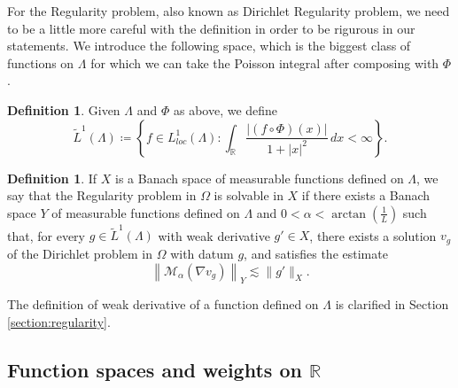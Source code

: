 \documentclass[12pt]{amsart}
\newcommand{\R}{\mathbb{R}}
\theoremstyle{plain}
\theoremstyle{definition}
\newtheorem{definition}[theorem]{Definition}
\numberwithin{equation}{section}
\begin{document}
For the Regularity problem, also known as Dirichlet Regularity problem, we need to be a little more careful with the definition in order to be rigurous in our statements. We introduce the following space, which is the biggest class of functions on $\Lambda$ for which we can take the Poisson integral after composing with $\Phi$.

\begin{definition}\label{def:spaceIntegrableFunctions}
    Given $\Lambda$ and $\Phi$ as above, we define
    \[
    \widetilde{L}^{1}(\Lambda)
    \coloneqq 
    \left\{
    f\in L_{loc}^{1}(\Lambda): \int_{\R}\frac{|(f\circ\Phi)(x)|}{1+|x|^2}\, dx<\infty
    \right\}.
    \]
\end{definition}



\begin{definition}\label{def:definitionSolvabilityRegularity}
If $X$ is a Banach space of measurable functions defined on $\Lambda$, we say that the Regularity problem in $\Omega$ is solvable in $X$ if there exists a Banach space $Y$ of measurable functions defined on $\Lambda$ and $0<\alpha<\arctan (\frac{1}{L})$ such that, for every $g \in \widetilde{L}^1(\Lambda)$ with weak derivative $g'\in X$, there exists a solution $v_g$ of the Dirichlet problem in $\Omega$ with datum $g$, and satisfies the estimate
\begin{equation}\label{eq:regularityEstimate}
\left\|\mathcal{M}_\alpha (\nabla v_g)\right\|_Y 
\lesssim
\|g'\|_X.    
\end{equation}
\end{definition}

The definition of weak derivative of a function defined on $\Lambda$ is clarified in Section \ref{section:regularity}.

























\subsection{Function spaces and weights on \texorpdfstring{$\R$}{}}
\end{document}
